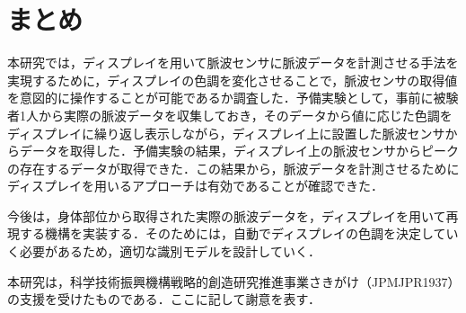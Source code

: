 \documentclass[submit,techrep]{ipsj}
\begin{document}
\section{まとめ}
\label{conclude}
本研究では，ディスプレイを用いて脈波センサに脈波データを計測させる手法を実現するために，ディスプレイの色調を変化させることで，脈波センサの取得値を意図的に操作することが可能であるか調査した．予備実験として，事前に被験者1人から実際の脈波データを収集しておき，そのデータから値に応じた色調をディスプレイに繰り返し表示しながら，ディスプレイ上に設置した脈波センサからデータを取得した．予備実験の結果，ディスプレイ上の脈波センサからピークの存在するデータが取得できた．この結果から，脈波データを計測させるためにディスプレイを用いるアプローチは有効であることが確認できた．
\par

今後は，身体部位から取得された実際の脈波データを，ディスプレイを用いて再現する機構を実装する．そのためには，自動でディスプレイの色調を決定していく必要があるため，適切な識別モデルを設計していく．

\begin{acknowledgment}
本研究は，科学技術振興機構戦略的創造研究推進事業さきがけ（JPMJPR1937）の支援を受けたものである．ここに記して謝意を表す．
\end{acknowledgment}




\end{document}
